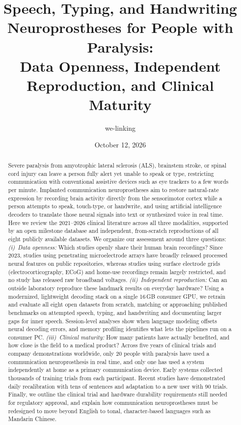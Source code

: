 \documentclass[11pt]{article}
\title{\bfseries Speech, Typing, and Handwriting
Neuroprostheses for People with Paralysis:\\
Data Openness, Independent Reproduction, and Clinical Maturity}
\author{we-linking}
\date{October 12, 2026}
\begin{document}
\maketitle

\begin{abstract}
\noindent
Severe paralysis from amyotrophic lateral sclerosis (ALS), brainstem
stroke, or spinal cord injury can leave a person fully alert yet unable
to speak or type, restricting communication with conventional assistive
devices such as eye trackers to a few words per minute. Implanted
communication neuroprostheses aim to restore natural-rate expression by
recording brain activity directly from the sensorimotor cortex while a
person attempts to speak, touch-type, or handwrite, and using artificial
intelligence decoders to translate those neural signals into text or
synthesized voice in real time. Here we review the 2021--2026 clinical
literature across all three modalities, supported by an open milestone
database and independent, from-scratch reproductions of all eight
publicly available datasets. We organize our assessment around three
questions:
\emph{(i)~Data openness:} Which studies openly share their human brain
recordings? Since 2023, studies using penetrating microelectrode arrays
have broadly released processed neural features on public repositories,
whereas studies using surface electrode grids (electrocorticography,
ECoG) and home-use recordings remain largely restricted, and no study
has released raw broadband voltages.
\emph{(ii)~Independent reproduction:} Can an outside laboratory
reproduce these landmark results on everyday hardware? Using a
modernized, lightweight decoding stack on a single 16\,GB consumer GPU,
we retrain and evaluate all eight open datasets from scratch, matching
or approaching published benchmarks on attempted speech, typing, and
handwriting and documenting larger gaps for inner speech. Session-level
analyses show when language modeling offsets neural decoding errors,
and memory profiling identifies what lets the pipelines run on a
consumer PC.
\emph{(iii)~Clinical maturity:} How many patients have actually
benefited, and how close is the field to a medical product? Across five
years of clinical trials and company demonstrations worldwide, only 20
people with paralysis have used a communication neuroprosthesis in real
time, and only one has used a system independently at home as a primary
communication device. Early systems collected thousands of training
trials from each participant. Recent studies have demonstrated daily
recalibration with tens of sentences and adaptation to a new user with
90 trials. Finally, we outline the clinical trial and
hardware durability requirements still needed for regulatory approval,
and explain how communication neuroprostheses must be redesigned to move
beyond English to tonal, character-based languages such as Mandarin
Chinese.
\end{abstract}
\end{document}
